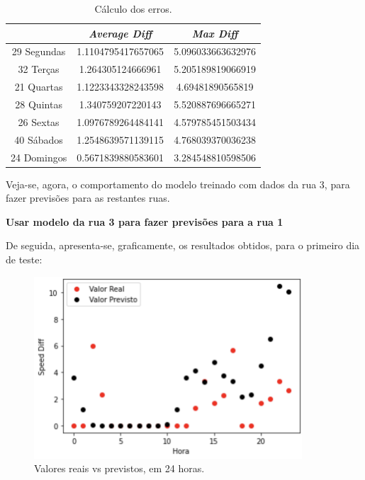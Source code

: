 \documentclass[a4paper, 12pt]{article}
\begin{document}
\begin{table}[H]
	\centering
	\begin{tabular}{||c||c|c||}
		\hline\hline
		& \textit{Average Diff} & \textit{Max Diff} \\
		\hline\hline
		29 Segundas & 
1.1104795417657065
 & 5.096033663632976\\
		\hline
		32 Terças  &

1.264305124666961 & 5.205189819066919 \\
		\hline
		21 Quartas & 
1.1223343328243598
 & 4.69481890565819 \\
		\hline
		28 Quintas  & 
1.340759207220143
 & 5.520887696665271\\
		\hline
		26 Sextas & 1.0976789264484141
 & 4.579785451503434\\
		\hline
		40 Sábados  & 
1.2548639571139115& 4.768039370036238 \\
		\hline
		24 Domingos & 
0.5671839880583601
 & 
3.284548810598506 \\
		\hline\hline
	\end{tabular}
	\label{table:rua3}
	\caption{Cálculo dos erros.}
\end{table}

Veja-se, agora, o comportamento do modelo treinado com dados da rua $3$, para fazer previsões para as restantes ruas.

\vspace{0.5cm}
\textbf{Usar modelo da rua 3 para fazer previsões para a rua 1}

De seguida, apresenta-se, graficamente, os resultados obtidos, para o primeiro dia de teste:

\begin{figure}[H]
	\centering
	\includegraphics[width=10cm]{resultados/real_prev_mod3_rua1.png}
	\caption{Valores reais vs previstos, em 24 horas.}
\end{figure}
\end{document}

